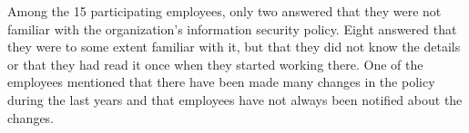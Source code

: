
Among the 15 participating employees, only two answered that they were not familiar with the organization's information security policy. Eight answered that they were to some extent familiar with it, but that they did not know the details or that they had read it once when they started working there. One of the employees mentioned that there have been made many changes in the policy during the last years and that employees have not always been notified about the changes.

